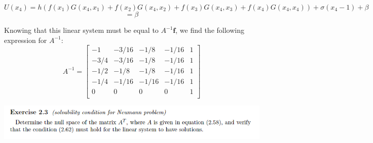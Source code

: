 \documentclass{article}
\begin{document}
\[U(x_4) = h(f(x_1)G(x_4,x_1) + f(x_2)G(x_4,x_2) + f(x_3)G(x_4,x_3) + f(x_4)G(x_4,x_4)) + \sigma (x_4 - 1) + \beta\]
\[ = \beta\]

Knowing that this linear system must be equal to $A^{-1}\textbf{f}$, we find the following expression for $A^{-1}$:
\[A^{-1} = \begin{bmatrix}
    -1 & -3/16 & -1/8 & -1/16 & 1\\
    -3/4 & -3/16 & -1/8 & -1/16 & 1\\
    -1/2 & -1/8 & -1/8 & -1/16 & 1\\
    -1/4 & -1/16 & -1/16 & -1/16 & 1\\
    0 & 0 & 0 & 0 & 1\\
\end{bmatrix}\]




\includegraphics[scale = 0.75]{prob3.PNG}
\newline\newline
\end{document}
